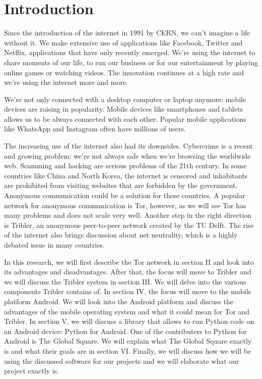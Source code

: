 \section{Introduction}
	Since the introduction of the internet in 1991 by CERN, we can't imagine a life without it. We make extensive use of applications like Facebook, Twitter and Netflix, applications that have only recently emerged. We're using the internet to share moments of our life, to run our business or for our entertainment by playing online games or watching videos. The innovation continues at a high rate and we're using the internet more and more.
	
	We're not only connected with a desktop computer or laptop anymore: mobile devices are raising in popularity. Mobile devices like smartphones and tablets allows us to be always connected with each other. Popular mobile applications like WhatsApp and Instagram often have millions of users.
	
	The increasing use of the internet also had its downsides. Cybercrime is a recent and growing problem: we're not always safe when we're browsing the worldwide web. Scamming and hacking are serious problems of the 21th century. In some countries like China and North Korea, the internet is censored and inhabitants are prohibited from visiting websites that are forbidden by the government. Anonymous communication could be a solution for these countries. A popular network for anonymous communication is Tor, however, as we will see Tor has many problems and does not scale very well. Another step in the right direction is Tribler, an anonymous peer-to-peer network created by the TU Delft. The rise of the internet also brings discussion about net neutrality, which is a highly debated issue in many countries.
	
	In this research, we will first describe the Tor network in section II and look into its advantages and disadvantages. After that, the focus will move to Tribler and we will discuss the Tribler system in section III. We will delve into the various components Tribler contains of. In section IV, the focus will move to the mobile platform Android. We will look into the Android platform and discuss the advantages of the mobile operating system and what it could mean for Tor and Tribler. In section V, we will discuss a library that allows to run Python code on an Android device: Python for Android. One of the contributers to Python for Android is The Global Square. We will explain what The Global Square exactly is and what their goals are in section VI. Finally, we will discuss how we will be using the discussed software for our projects and we will elaborate what our project exactly is.